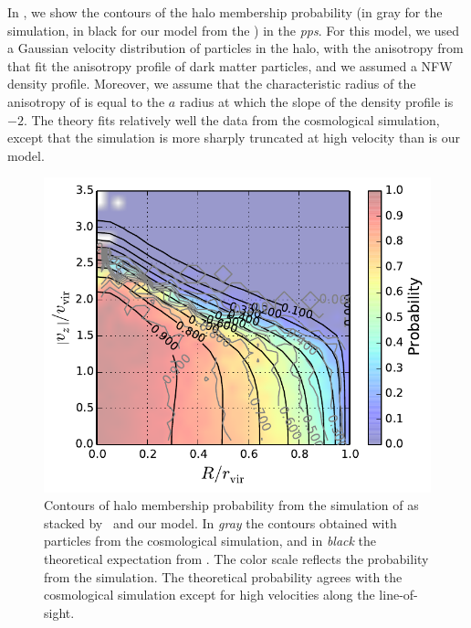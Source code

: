 In , we show the contours of the halo membership
probability (in gray for the simulation, in black for our model from the
) in the \emph{pps}. For this model, we used a
Gaussian velocity distribution of particles in the halo, with the anisotropy
from \citet{ML+05} that fit the anisotropy profile of dark matter particles,
and we assumed a NFW density profile. Moreover, we assume that the
characteristic radius of the anisotropy of \citet{ML+05} is equal to the $a$
radius at which the slope of the density profile is $-2$. The theory fits
relatively well the data from the cosmological simulation, except that the
simulation is more sharply truncated at high velocity than is our model.
%
\begin{figure}[ht]
    \centering
    \includegraphics[width=0.6\linewidth]{figures/maggie/probabilities.pdf}
    \caption{Contours of halo membership probability from the simulation of
        \citet{Borgani+01} as stacked by~\cite{MBM+10} and our model. In
        \emph{gray} the contours obtained with particles from the cosmological
        simulation, and in \emph{black} the theoretical expectation from
        . The color scale reflects the probability
        from the simulation. The theoretical probability agrees with the
        cosmological simulation except for high velocities along the
    line-of-sight.\label{fig:probabilities}}
\end{figure}

